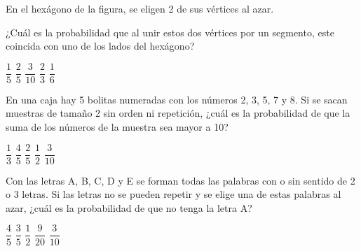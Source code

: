 \documentclass[sin nombre]{srs}
\begin{document}
\begin{preguntas}[after-item-skip=2cm]
\pregunta En el hexágono de la figura, se eligen 2 de sus vértices al azar.
\begin{centrado}
\end{centrado}
¿Cuál es la probabilidad que al unir estos dos vértices por un segmento, este coincida con uno de los lados del hexágono?
\begin{vertical}
\alternativa $\dfrac{1}{5}$
\alternativa $\dfrac{2}{5}$
\alternativa $\dfrac{3}{10}$
\alternativa $\dfrac{2}{3}$
\alternativa $\dfrac{1}{6}$
\end{vertical}

\pregunta En una caja hay 5 bolitas numeradas con los números 2, 3, 5, 7 y 8. Si se sacan muestras de tamaño 2 sin orden ni repetición, ¿cuál es la probabilidad de que la suma de los números de la muestra sea mayor a 10?
\begin{vertical}
\alternativa $\dfrac{1}{3}$
\alternativa $\dfrac{4}{5}$
\alternativa $\dfrac{2}{5}$
\alternativa $\dfrac{1}{2}$
\alternativa $\dfrac{3}{10}$
\end{vertical}

\pregunta Con las letras A, B, C, D y E se forman todas las palabras con o sin sentido de 2 o 3 letras. Si las letras no se pueden repetir y se elige una de estas palabras al azar, ¿cuál es la probabilidad de que no tenga la letra A?
\begin{vertical}
\alternativa $\dfrac{4}{5}$
\alternativa $\dfrac{3}{5}$
\alternativa $\dfrac{1}{2}$
\alternativa $\dfrac{9}{20}$
\alternativa $\dfrac{3}{10}$
\end{vertical}
\end{preguntas}
\end{document}
